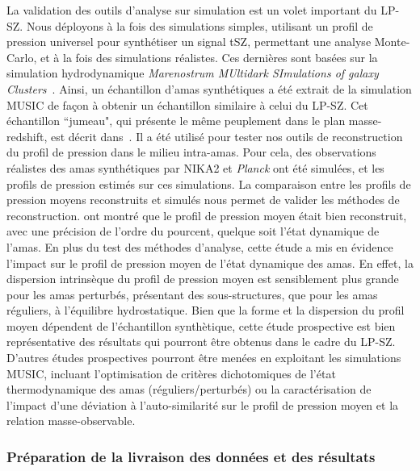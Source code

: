 La validation des outils d'analyse sur simulation est un volet
important du LP-SZ. Nous déployons à la fois des simulations simples,
utilisant un profil de pression universel pour synthétiser un signal
tSZ, permettant une analyse Monte-Carlo, et à la fois des simulations
réalistes. Ces dernières sont basées sur la simulation hydrodynamique
\emph{Marenostrum MUltidark SImulations of galaxy
  Clusters}~\citep[MUSIC][]{Sembolini2013}. Ainsi, un échantillon
d'amas synthétiques a été extrait de la simulation MUSIC de façon à
obtenir un échantillon similaire à celui du LP-SZ. Cet échantillon
``jumeau", qui présente le même peuplement dans le plan
masse-redshift, est décrit dans~\citet{Ruppin2019a}. Il a été utilisé
pour tester nos outils de reconstruction du profil de pression dans le
milieu intra-amas. Pour cela, des observations réalistes des amas
synthétiques par NIKA2 et \emph{Planck} ont été simulées, et les
profils de pression estimés sur ces simulations. La comparaison entre
les profils de pression moyens reconstruits et simulés nous permet de
valider les méthodes de reconstruction. \citet{Ruppin2019a} ont montré
que le profil de pression moyen était bien reconstruit, avec une
précision de l'ordre du pourcent, quelque soit l'état dynamique de
l'amas. En plus du test des méthodes d'analyse, cette étude a mis en
évidence l'impact sur le profil de pression moyen de l'état dynamique
des amas. En effet, la dispersion intrinsèque du profil de pression
moyen est sensiblement plus grande pour les amas perturbés, présentant
des sous-structures, que pour les amas réguliers, à l'équilibre
hydrostatique. Bien que la forme et la dispersion du profil moyen
dépendent de l'échantillon synthètique, cette étude prospective est
bien représentative des résultats qui pourront être obtenus dans le
cadre du LP-SZ. D'autres études prospectives pourront être menées en
exploitant les simulations MUSIC, incluant l'optimisation de critères
dichotomiques de l'état thermodynamique des amas
(réguliers/perturbés) ou la caractérisation de l'impact d'une déviation
à l'auto-similarité sur le profil de pression moyen et la relation
masse-observable.

\subsubsection{Préparation de la livraison des données et des résultats}

